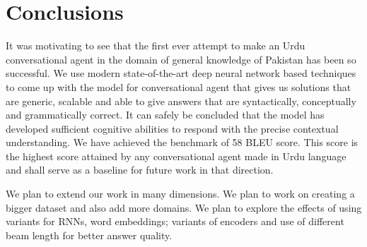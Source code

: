 \documentclass[conference]{IEEEtran}
\begin{document}
\section{Conclusions}
It was motivating to see that the first ever attempt to make an Urdu conversational agent in the domain of general knowledge of Pakistan has been so successful. We use modern state-of-the-art deep neural network based techniques to come up with the model for conversational agent that gives us solutions that are generic, scalable and able to give answers that are syntactically, conceptually and grammatically correct. It can safely be concluded that the model has developed sufficient cognitive abilities to respond with the precise contextual understanding. We have achieved the benchmark of 58 BLEU score. This score is the highest score attained by any conversational agent made in Urdu language and shall serve as a baseline for future work in that direction. 

We plan to extend our work in many dimensions. We plan to work on creating a bigger dataset and also add more domains. We plan to explore the effects of using variants for RNNs, word embeddings; variants of encoders and use of different beam length for better answer quality.
\end{document}

